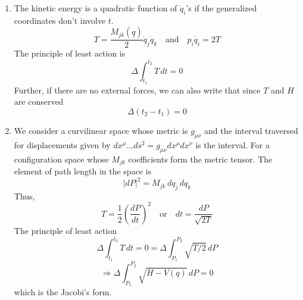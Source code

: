 \documentclass[12pt]{article}
\begin{document}
\begin{enumerate}
		\item The kinetic energy is a quadratic function of $\dot{q}_i$'s if the generalized coordinates don't involve $t$.
		\[ T = \frac{M_{jk}(\underline{q})}{2} \dot{q}_j \dot{q}_k \quad \text{and} \quad p_i \dot{q}_i = 2T \]
		The principle of least action is
		\[ \Delta \int_{t_1}^{t_2} T \, dt = 0 \]
		Further, if there are no external forces, we can also write that since $T$ and $H$ are conserved
		\[ \Delta (t_2 - t_1) = 0 \]
		
		\item We consider a curvilinear space whose metric is $g_{\mu\nu}$ and the interval traversed for displacements given by $dx^\mu \dots ds^2 = g_{\mu\nu} dx^\mu dx^\nu$ is the interval.
		For a configuration space whose $M_{jk}$ coefficients form the metric tensor. The element of path length in the space is
		\[ |dP|^2 = M_{jk} \, dq_j \, dq_k \]
		Thus,
		\[ T = \frac{1}{2} \left(\frac{dP}{dt}\right)^2 \quad \text{or} \quad dt = \frac{dP}{\sqrt{2T}} \]
		The principle of least action
		\[ \Delta \int_{t_1}^{t_2} T \, dt = 0 = \Delta \int_{P_1}^{P_2} \sqrt{T/2} \, dP \]
		\[ \Rightarrow \Delta \int_{P_1}^{P_2} \sqrt{H-V(q)} \, dP = 0 \]
		which is the Jacobi's form.
	\end{enumerate}
\end{document}
